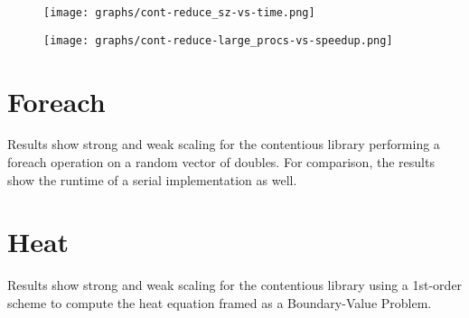 \begin{figure}[!h]
\centering
    \texttt{[image: graphs/cont-reduce\_sz-vs-time.png]}
\end{figure}
\begin{figure}[!h]
\centering
    \texttt{[image: graphs/cont-reduce-large\_procs-vs-speedup.png]}
\end{figure}

\section{Foreach}
Results show strong and weak scaling for the contentious library performing a
foreach operation on a random vector of doubles. For comparison, the results
show the runtime of a serial implementation as well.

\section{Heat}
Results show strong and weak scaling for the contentious library using a
1st-order scheme to compute the heat equation framed as a Boundary-Value
Problem.

\begin{comment}
With optimization turned on vec behaves a lot like seq. Without
optimization, vec is a lot slower. All these benchmarks use optimization flags,
so the results are almost identical between seq and veche "async"
implementation uses C++ threads with the async
\end{comment}

